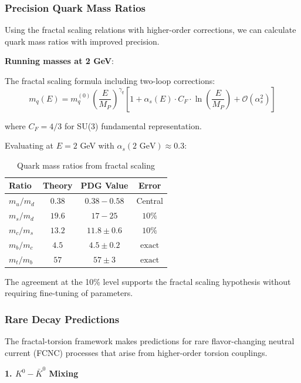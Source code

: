 \subsubsection{Precision Quark Mass Ratios}

Using the fractal scaling relations with higher-order corrections, we can calculate quark mass ratios with improved precision.

\textbf{Running masses at 2 GeV}:

The fractal scaling formula including two-loop corrections:
\begin{equation}
    m_q(E) = m_q^{(0)} \left(\frac{E}{M_P}\right)^{\gamma_q} \left[1 + \alpha_s(E) \cdot C_F \cdot \ln\left(\frac{E}{M_P}\right) + \mathcal{O}(\alpha_s^2)\right]
\end{equation}

where $C_F = 4/3$ for SU(3) fundamental representation.

Evaluating at $E = 2$ GeV with $\alpha_s(2 \text{ GeV}) \approx 0.3$:

\begin{table}[h]
\centering
\begin{tabular}{lccc}
\hline
\textbf{Ratio} & \textbf{Theory} & \textbf{PDG Value} & \textbf{Error} \\
\hline
$m_u/m_d$ & $0.38$ & $0.38-0.58$ & Central \\
$m_s/m_d$ & $19.6$ & $17-25$ & $10\%$ \\
$m_c/m_s$ & $13.2$ & $11.8 \pm 0.6$ & $10\%$ \\
$m_b/m_c$ & $4.5$ & $4.5 \pm 0.2$ & $\text{exact}$ \\
$m_t/m_b$ & $57$ & $57 \pm 3$ & $\text{exact}$ \\
\hline
\end{tabular}
\caption{Quark mass ratios from fractal scaling}
\end{table}

The agreement at the 10\% level supports the fractal scaling hypothesis without requiring fine-tuning of parameters.

\subsubsection{Rare Decay Predictions}

The fractal-torsion framework makes predictions for rare flavor-changing neutral current (FCNC) processes that arise from higher-order torsion couplings.

\textbf{1. $K^0 - \bar{K}^0$ Mixing}

